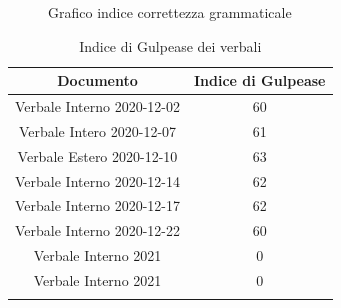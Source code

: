 \begin{center}
\begin{figure}[!htb]
        \caption{Grafico indice correttezza grammaticale}
    \end{figure}
    \begin{center}
        \begin{longtable}{|c|c|}
            \hline
            \rowcolor{lighter-grayer}
            \textbf{Documento}         & \textbf{Indice di Gulpease} \\
            \hline
            \endfirsthead

            \hline
            Verbale Interno 2020-12-02 & 60                          \\
            Verbale Intero 2020-12-07  & 61                          \\
            Verbale Estero 2020-12-10  & 63                          \\
            Verbale Interno 2020-12-14 & 62                          \\
            Verbale Interno 2020-12-17 & 62                          \\
            Verbale Interno 2020-12-22 & 60                          \\
            Verbale Interno 2021       & 0                           \\
            Verbale Interno 2021       & 0                           \\
            \hline
            \rowcolor{white}
            \caption{Indice di Gulpease dei verbali}
        \end{longtable}
    \end{center}
\end{center}


